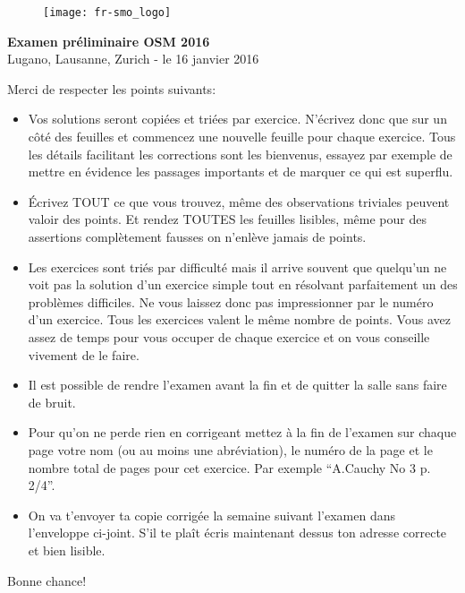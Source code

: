 \documentclass[12pt,a4paper]{article}
\begin{document}
\thispagestyle{empty}
\begin{figure}[h]
\texttt{[image: fr-smo\_logo]}
\end{figure}

\vspace{1cm}

\begin{center}
\Huge{\textbf{Examen préliminaire OSM 2016}}\\[1.5cm]
\large{Lugano, Lausanne, Zurich - le 16 janvier 2016}\\[3.5cm]
\end{center}


Merci de respecter les points suivants:

\begin{itemize}
\item Vos solutions seront copiées et triées par exercice. N'écrivez
donc que sur un côté des feuilles et commencez une nouvelle
feuille pour chaque exercice. Tous les détails facilitant les
corrections sont les bienvenus, essayez par exemple de mettre en
évidence les passages importants et de marquer ce qui est superflu.

\item Écrivez TOUT ce que vous trouvez, même des observations
triviales peuvent valoir des points. Et rendez TOUTES les feuilles
lisibles, même pour des assertions complètement fausses on n'enlève
jamais de points.

\item Les exercices sont triés par difficulté mais il arrive souvent
que quelqu'un ne voit pas la solution d'un exercice simple tout en
résolvant parfaitement un des problèmes difficiles. Ne vous laissez
donc pas impressionner par le numéro d'un exercice. Tous les
exercices valent le même nombre de points. Vous avez assez de temps
pour vous occuper de chaque exercice et on vous conseille vivement
de le faire.

\item Il est possible de rendre l'examen avant la fin et de quitter
la salle sans faire de bruit.

\item Pour qu'on ne perde rien en corrigeant mettez à la fin de
l'examen sur chaque page votre nom (ou au moins une abréviation), le
numéro de la page et le nombre total de pages pour cet exercice. Par
exemple "`A.Cauchy No 3 p. 2/4"'.

\item On va t'envoyer ta copie corrigée la semaine suivant l'examen
dans l'enveloppe ci-joint. S'il te plaît écris maintenant dessus ton
adresse correcte et bien lisible.

\end{itemize}

\vspace{0.5cm}

\begin{center}
Bonne chance!
\end{center}
\end{document}
